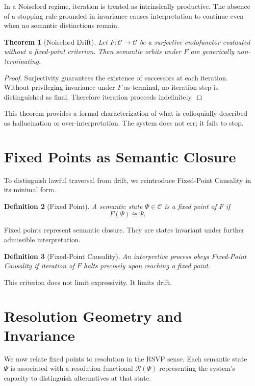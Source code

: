 \documentclass[12pt]{article}
\newtheorem{theorem}{Theorem}[section]
\newtheorem{definition}[theorem]{Definition}
\theoremstyle{remark}
\begin{document}
In a Noiselord regime, iteration is treated as intrinsically productive. The absence of a stopping rule grounded in invariance causes interpretation to continue even when no semantic distinctions remain.

\begin{theorem}[Noiselord Drift]
Let $F : \mathcal{C} \to \mathcal{C}$ be a surjective endofunctor evaluated without a fixed-point criterion. Then semantic orbits under $F$ are generically non-terminating.
\end{theorem}

\begin{proof}
Surjectivity guarantees the existence of successors at each iteration. Without privileging invariance under $F$ as terminal, no iteration step is distinguished as final. Therefore iteration proceeds indefinitely.
\end{proof}

This theorem provides a formal characterization of what is colloquially described as hallucination or over-interpretation. The system does not err; it fails to stop.

\section{Fixed Points as Semantic Closure}

To distinguish lawful traversal from drift, we reintroduce Fixed-Point Causality in its minimal form.

\begin{definition}[Fixed Point]
A semantic state $\Psi \in \mathcal{C}$ is a fixed point of $F$ if
\[
F(\Psi) \cong \Psi.
\]
\end{definition}

Fixed points represent semantic closure. They are states invariant under further admissible interpretation.

\begin{definition}[Fixed-Point Causality]
An interpretive process obeys Fixed-Point Causality if iteration of $F$ halts precisely upon reaching a fixed point.
\end{definition}

This criterion does not limit expressivity. It limits drift.

\section{Resolution Geometry and Invariance}

We now relate fixed points to resolution in the RSVP sense. Each semantic state $\Psi$ is associated with a resolution functional $\mathcal{R}(\Psi)$ representing the system’s capacity to distinguish alternatives at that state.
\end{document}

